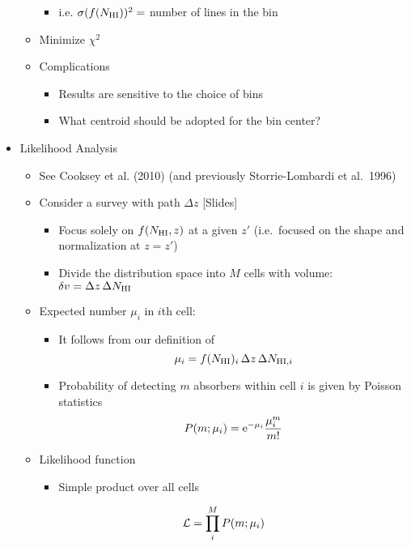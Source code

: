 \documentclass[12pt,letterpaper]{article}
\begin{document}
\begin{Aenumerate}
\begin{itemize}
\begin{itemize}
			\begin{itemize}
			\item i.e. $\sigma(f(N_{\rm HI}))^2 = $ number of lines in the bin
			\end{itemize}
		\item Minimize $\chi^2$
		\item Complications
			\begin{itemize}
			\item Results are sensitive to the choice of bins
			\item What centroid should be adopted for the bin center?
			\end{itemize}
		\end{itemize}
	\item Likelihood Analysis
		\begin{itemize}
		\item See Cooksey et al. (2010) (and previously Storrie-Lombardi et al.\ 1996)
		\item Consider a survey with path $\Delta z$ [Slides]
			\begin{itemize}
			\item Focus solely on $f(N_{\rm HI},z)$ at a given $z'$ 
			(i.e.\ focused on the shape and normalization at $z=z'$)
			\item Divide the distribution space into $M$ cells with 
			volume: $\delta v = \Delta z \, \Delta N_{\rm HI}$
			\end{itemize}
		\item Expected number $\mu_i$ in $i$th cell:
			\begin{itemize}
			\item It follows from our definition of \fnhi
			\begin{equation}
			\mu_i = f(N_{\rm HI})_i \, \Delta z \, \Delta N_{{\rm HI},i}
			\end{equation}
			\item Probability of detecting $m$ absorbers within 
		cell $i$ is given by Poisson statistics
		\begin{equation}
		P(m; \mu_i) = {\rm e}^{-\mu_i} \frac{\mu_i^m}{m!}
		\end{equation}
			\end{itemize}
		\item Likelihood function
			\begin{itemize}
			\item Simple product over all cells
			\end{itemize}
		\begin{equation}
		\mathcal{L} = \prod\limits_i^M P(m; \mu_i)
		\end{equation}


\end{itemize}
\end{itemize}
\end{Aenumerate}
\end{document}

